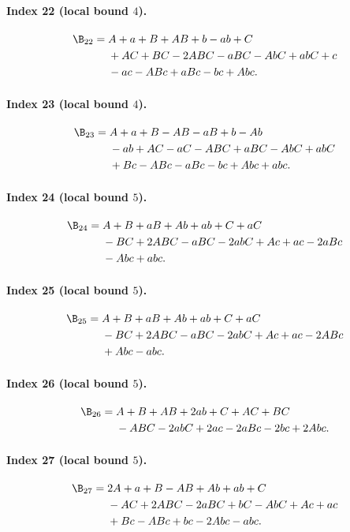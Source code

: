\paragraph{Index 22 (local bound $4$).}
\begin{align*}
\B_{22}={}&A +a +B +AB +b -ab +C\\
&{}+AC +BC -2ABC -aBC -AbC +abC +c\\
&{}-ac -ABc +aBc -bc +Abc.
\end{align*}
\paragraph{Index 23 (local bound $4$).}
\begin{align*}
\B_{23}={}&A +a +B -AB -aB +b -Ab\\
&{}-ab +AC -aC -ABC +aBC -AbC +abC\\
&{}+Bc -ABc -aBc -bc +Abc +abc.
\end{align*}
\paragraph{Index 24 (local bound $5$).}
\begin{align*}
\B_{24}={}&A +B +aB +Ab +ab +C +aC\\
&{}-BC +2ABC -aBC -2abC +Ac +ac -2aBc\\
&{}-Abc +abc.
\end{align*}
\paragraph{Index 25 (local bound $5$).}
\begin{align*}
\B_{25}={}&A +B +aB +Ab +ab +C +aC\\
&{}-BC +2ABC -aBC -2abC +Ac +ac -2ABc\\
&{}+Abc -abc.
\end{align*}
\paragraph{Index 26 (local bound $5$).}
\begin{align*}
\B_{26}={}&A +B +AB +2ab +C +AC +BC\\
&{}-ABC -2abC +2ac -2aBc -2bc +2Abc.
\end{align*}
\paragraph{Index 27 (local bound $5$).}
\begin{align*}
\B_{27}={}&2A +a +B -AB +Ab +ab +C\\
&{}-AC +2ABC -2aBC +bC -AbC +Ac +ac\\
&{}+Bc -ABc +bc -2Abc -abc.
\end{align*}
